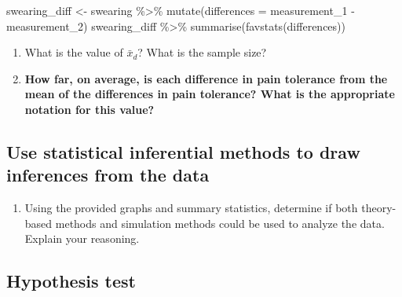 \documentclass[
]{report}
\newenvironment{Shaded}{\begin{snugshade}}{\end{snugshade}}
\newcommand{\AttributeTok}[1]{\textcolor[rgb]{0.77,0.63,0.00}{#1}}
\newcommand{\FunctionTok}[1]{\textcolor[rgb]{0.00,0.00,0.00}{#1}}
\newcommand{\NormalTok}[1]{#1}
\newcommand{\OtherTok}[1]{\textcolor[rgb]{0.56,0.35,0.01}{#1}}
\newcommand{\SpecialCharTok}[1]{\textcolor[rgb]{0.00,0.00,0.00}{#1}}
\providecommand{\tightlist}{%
  \setlength{\itemsep}{0pt}\setlength{\parskip}{0pt}}
\begin{document}
\begin{Shaded}
\begin{Highlighting}[]
\NormalTok{swearing\_diff }\OtherTok{\textless{}{-}}\NormalTok{ swearing }\SpecialCharTok{\%\textgreater{}\%} 
  \FunctionTok{mutate}\NormalTok{(}\AttributeTok{differences =}\NormalTok{ measurement\_1 }\SpecialCharTok{{-}}\NormalTok{ measurement\_2)}
\NormalTok{swearing\_diff }\SpecialCharTok{\%\textgreater{}\%} 
    \FunctionTok{summarise}\NormalTok{(}\FunctionTok{favstats}\NormalTok{(differences))}
\end{Highlighting}
\end{Shaded}

\begin{enumerate}
\def\labelenumi{\arabic{enumi}.}
\setcounter{enumi}{7}
\item
  What is the value of \(\bar{x}_d\)? What is the sample size?
  \vspace{0.25in}
\item
  \textbf{How far, on average, is each difference in pain tolerance from the mean of the differences in pain tolerance? What is the appropriate notation for this value?}
\end{enumerate}

\vspace{0.5in}

\hypertarget{use-statistical-inferential-methods-to-draw-inferences-from-the-data-2}{%
\subsection*{Use statistical inferential methods to draw inferences from the data}\label{use-statistical-inferential-methods-to-draw-inferences-from-the-data-2}}

\begin{enumerate}
\def\labelenumi{\arabic{enumi}.}
\setcounter{enumi}{9}
\tightlist
\item
  Using the provided graphs and summary statistics, determine if both theory-based methods and simulation methods could be used to analyze the data. Explain your reasoning.
\end{enumerate}

\vspace{0.8in}

\hypertarget{hypothesis-test-1}{%
\subsection*{Hypothesis test}\label{hypothesis-test-1}}
\end{document}
